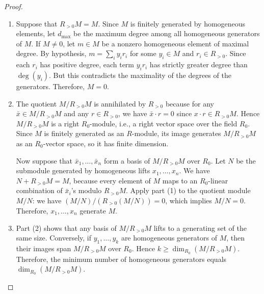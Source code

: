 \begin{proof}

	\begin{enumerate}
	    \item Suppose that $R_{>0}M = M$. Since $M$ is finitely generated by homogeneous elements, let $d_{\max}$ be the maximum degree among all homogeneous generators of $M$. If $M \neq 0$, let $m \in M$ be a nonzero homogeneous element of maximal degree. By hypothesis, $m = \sum_i y_i r_i$ for some $y_i \in M$ and $r_i \in R_{>0}$. Since each $r_i$ has positive degree, each term $y_i r_i$ has strictly greater degree than $\deg(y_i)$. But this contradicts the maximality of the degrees of the generators. Therefore, $M = 0$.

	    \item The quotient $M/R_{>0}M$ is annihilated by $R_{>0}$ because for any $\bar{x} \in M/R_{>0}M$ and any $r \in R_{>0}$, we have $\bar{x} \cdot r = 0$ since $x \cdot r \in R_{>0}M$. Hence $M/R_{>0}M$ is a right $R_0$-module, i.e., a right vector space over the field $R_0$. Since $M$ is finitely generated as an $R$-module, its image generates $M/R_{>0}M$ as an $R_0$-vector space, so it has finite dimension.

	    Now suppose that $\bar{x}_1, \ldots, \bar{x}_n$ form a basis of $M/R_{>0}M$ over $R_0$. Let $N$ be the submodule generated by homogeneous lifts $x_1, \ldots, x_n$. We have $N + R_{>0}M = M$, because every element of $M$ maps to an $R_0$-linear combination of $\bar{x}_i$'s modulo $R_{>0}M$. Apply part (1) to the quotient module $M/N$: we have $(M/N)/(R_{>0}(M/N)) = 0$, which implies $M/N = 0$. Therefore, $x_1, \ldots, x_n$ generate $M$.

	    \item Part (2) shows that any basis of $M/R_{>0}M$ lifts to a generating set of the same size. Conversely, if $y_1, \ldots, y_k$ are homogeneous generators of $M$, then their images span $M/R_{>0}M$ over $R_0$. Hence $k \geq \dim_{R_0}(M/R_{>0}M)$. Therefore, the minimum number of homogeneous generators equals $\dim_{R_0}(M/R_{>0}M)$.
	\end{enumerate}
\end{proof}

